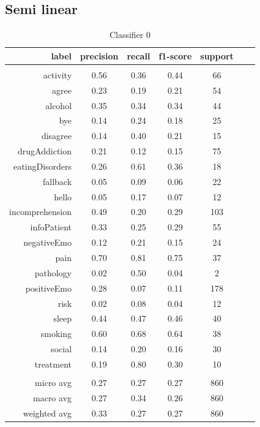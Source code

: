 \documentclass[11pt]{article}
\begin{document}
\subsection{Semi linear}
\begin{table}[htb]
\begin{center}
\begin{tabular}{ |r|c|c|c|c|c|c| }
\hline
label 			& precision & recall & f1-score & support\\ \hline 
\\ \hline 
activity 		&  0.56 & 0.36 & 0.44 &   66\\ \hline 
agree 			&  0.23 & 0.19 & 0.21 &   54\\ \hline 
alcohol 		&  0.35 & 0.34 & 0.34 &   44\\ \hline 
bye 			&  0.14 & 0.24 & 0.18 &   25\\ \hline 
disagree 		&  0.14 & 0.40 & 0.21 &   15\\ \hline 
drugAddiction 	&  0.21 & 0.12 & 0.15 &   75\\ \hline 
eatingDisorders &  0.26 & 0.61 & 0.36 &   18\\ \hline 
fallback 		&  0.05 & 0.09 & 0.06 &   22\\ \hline 
hello 			&  0.05 & 0.17 & 0.07 &   12\\ \hline 
incomprehension &  0.49 & 0.20 & 0.29 &  103\\ \hline 
infoPatient 	&  0.33 & 0.25 & 0.29 &   55\\ \hline 
negativeEmo 	&  0.12 & 0.21 & 0.15 &   24\\ \hline 
pain 			&  0.70 & 0.81 & 0.75 &   37\\ \hline 
pathology 		&  0.02 & 0.50 & 0.04 &    2\\ \hline 
positiveEmo 	&  0.28 & 0.07 & 0.11 &  178\\ \hline 
risk 			&  0.02 & 0.08 & 0.04 &   12\\ \hline 
sleep 			&  0.44 & 0.47 & 0.46 &   40\\ \hline 
smoking 		&  0.60 & 0.68 & 0.64 &   38\\ \hline 
social 			&  0.14 & 0.20 & 0.16 &   30\\ \hline 
treatment		&  0.19 & 0.80 & 0.30 &   10\\ \hline 
\\ \hline 
micro avg 		&  0.27 & 0.27 & 0.27 &  860\\ \hline 
macro avg 		&  0.27 & 0.34 & 0.26 &  860\\ \hline 
weighted avg 	&  0.33 & 0.27 & 0.27 &  860\\ \hline 
\end{tabular}
\caption{Classifier 0}
\end{center}
\end{table}
\FloatBarrier
\end{document}
